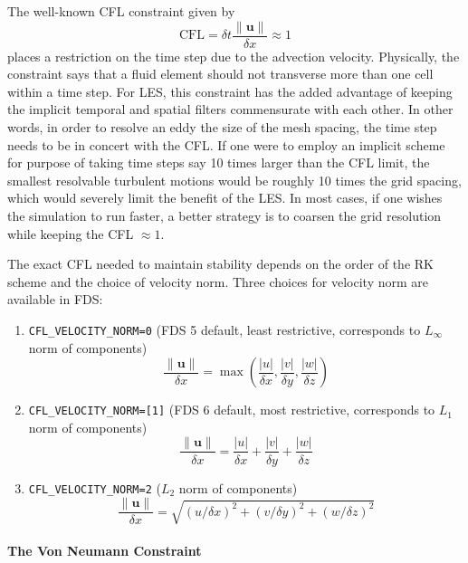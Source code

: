 \documentclass[11pt]{article}
\begin{document}
The well-known CFL constraint given by
\begin{equation}
\mbox{CFL} = \delta t \frac{\|\mathbf{u}\|}{\delta x} \approx 1
\end{equation}
places a restriction on the time step due to the advection velocity. Physically, the constraint says that a fluid element should not transverse more than one cell within a time step. For LES, this constraint has the added advantage of keeping the implicit temporal and spatial filters commensurate with each other.  In other words, in order to resolve an eddy the size of the mesh spacing, the time step needs to be in concert with the CFL.  If one were to employ an implicit scheme for purpose of taking time steps say 10 times larger than the CFL limit, the smallest resolvable turbulent motions would be roughly 10 times the grid spacing, which would severely limit the benefit of the LES.  In most cases, if one wishes the simulation to run faster, a better strategy is to coarsen the grid resolution while keeping the CFL $\approx 1$.

The exact CFL needed to maintain stability depends on the order of the RK scheme and the choice of velocity norm. Three choices for velocity norm are available in FDS:
\begin{enumerate}
\item[]{\tt CFL\_VELOCITY\_NORM=0} (FDS 5 default, least restrictive, corresponds to $L_\infty$ norm of components) 
    \begin{equation}
    \frac{\|\mathbf{u}\|}{\delta x} = \max \left(\frac{|u|}{\delta x}, \frac{|v|}{\delta y}, \frac{|w|}{\delta z}\right)
    \end{equation}
\item[]{\tt CFL\_VELOCITY\_NORM=[1]} (FDS 6 default, most restrictive, corresponds to $L_1$ norm of components)
    \begin{equation}
    \frac{\|\mathbf{u}\|}{\delta x} = \frac{|u|}{\delta x}+\frac{|v|}{\delta y}+\frac{|w|}{\delta z}
    \end{equation}
\item[]{\tt CFL\_VELOCITY\_NORM=2} ($L_2$ norm of components)
    \begin{equation}
    \frac{\|\mathbf{u}\|}{\delta x} = \sqrt{ (u/\delta x)^2+(v/\delta y)^2+(w/\delta z)^2 }
    \end{equation}
\end{enumerate}


\paragraph{The Von Neumann Constraint}
\end{document}
